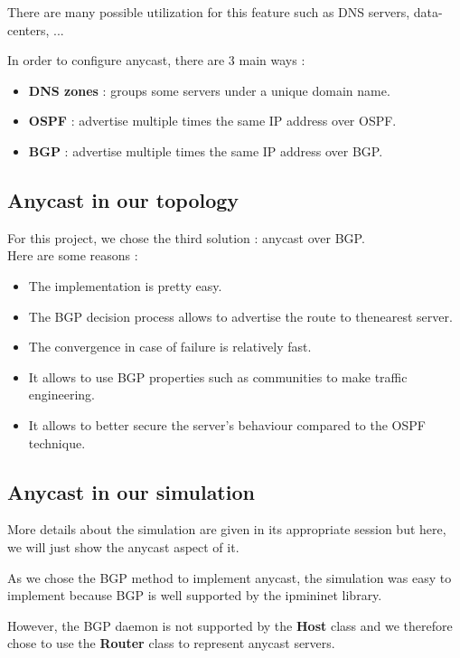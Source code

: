 \documentclass[letter, 9pt, conference]{ieeeconf}
\begin{document}
There are many possible utilization for this feature such as DNS servers, data-centers, ... 

In order to configure anycast, there are 3 main ways : 
\begin{itemize}
    \item \textbf{DNS zones} : groups some servers under a unique domain name. 
    \item \textbf{OSPF} : advertise multiple times the same IP address over OSPF. 
    \item \textbf{BGP} : advertise multiple times the same IP address over BGP. 
\end{itemize}

\subsection{Anycast in our topology}

For this project, we chose the third solution : anycast over BGP. \\
Here are some reasons : 
\begin{itemize}
    \item The implementation is pretty easy. 
    \item The BGP decision process allows to advertise the route to thenearest server. 
    \item The convergence in case of failure is relatively fast. 
    \item It allows to use BGP properties such as communities to make traffic engineering. 
    \item It allows to better secure the server's behaviour compared to the OSPF technique. 
\end{itemize}

\subsection{Anycast in our simulation}

More details about the simulation are given in its appropriate session but here, we will just show the anycast aspect of it. 

As we chose the BGP method to implement anycast, the simulation was easy to implement because BGP is well supported by the ipmininet library. 

However, the BGP daemon is not supported by the \textbf{Host} class and we therefore chose to use the \textbf{Router} class to represent anycast servers. 
\end{document}
